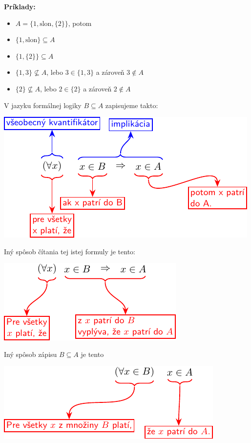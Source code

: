 \noindent\textbf{Príklady:}
\begin{itemize}
    \item $A=\{1, \text{slon}, \{2\}\}$, potom
    \item $\{1, \text{slon}\} \subseteq A$
    \item $\{1, \{2\}\} \subseteq A$
    \item $\{1,3\} \not\subseteq A$, lebo $3 \in \{1,3\}$ a zároveň $3 \notin A$
    \item $\{2\} \not\subseteq A$, lebo $2 \in \{2\}$ a zároveň $2 \notin A$
\end{itemize}

\noindent V jazyku formálnej logiky $B \subseteq A$ zapisujeme takto:
\begin{center}
\includegraphics{figures/predn1_fig1.pdf}
\end{center}
\noindent Iný spôsob čítania tej istej formuly je tento:
\begin{center}
\includegraphics{figures/predn1_fig2.pdf}
\end{center}
Iný spôsob zápisu $B\subseteq A$ je tento
\begin{center}
\includegraphics{figures/predn1_fig3.pdf}
\end{center}
